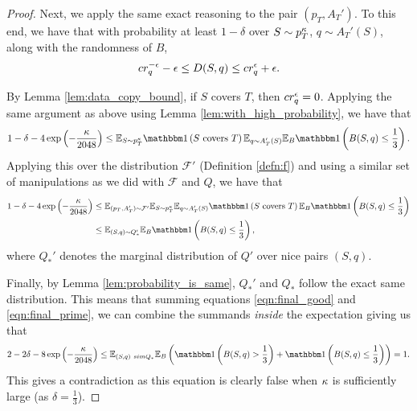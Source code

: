 \begin{proof}
Next, we apply the same exact reasoning to the pair $(p_T, A_T')$. To this end, we have that with probability at least $1 - \delta$ over $S \sim p_T^\kappa$, $q \sim A_T'(S)$, along with the randomness of $B$, $$cr_q^{-\epsilon} - \epsilon \leq D(S, q) \leq cr_q^{\epsilon} + \epsilon.$$ 

By Lemma \ref{lem:data_copy_bound}, if $S$ covers $T$, then $cr_q^\epsilon = 0$. Applying the same argument as above using Lemma \ref{lem:with_high_probability}, we have that 
\begin{equation*}
\begin{split}
1 - \delta -  4\exp\left(-\frac{\a}{2048}\right)\leq \E_{S \sim p_T^\a}\ind\left(S\text{ covers }T\right)\E_{q \sim A_T'(S)}\E_B \ind\left(B(S, q) \leq \frac{1}{3} \right).
\end{split}
\end{equation*}
Applying this over the distribution $\mathcal{F}'$ (Definition \ref{defn:f}) and using a similar set of manipulations as we did with $\mathcal{F}$ and $Q$, we have that
\begin{equation}\label{eqn:final_prime}
\begin{split}
1 - \delta -  4\exp\left(-\frac{\a}{2048}\right) &\leq \mathbb{E}_{(p_T, A_T') \sim \mathcal{F'}} \mathbb{E}_{S \sim p_T^\a}\mathbb{E}_{q \sim A_T'(S)} \ind\left(S\text{ covers }T\right)\mathbb{E}_{B}\ind\left(B(S, q) \leq \frac{1}{3}\right)\\
&\leq \mathbb{E}_{(S, q) \sim Q_*'}\mathbb{E}_{B}\ind\left(B(S, q) \leq \frac{1}{3}\right),
\end{split}
\end{equation}
where $Q_*'$ denotes the marginal distribution of $Q'$ over nice pairs $(S, q)$. 

Finally, by Lemma \ref{lem:probability_is_same}, $Q_*'$ and $Q_*$ follow the exact same distribution. This means that summing equations \ref{eqn:final_good} and \ref{eqn:final_prime}, we can combine the summands \textit{inside} the expectation giving us that $$2 - 2\delta - 8\exp\left(-\frac{\a}{2048}\right) \leq \E_{(S, q)\ sim Q_*} \E_B \left(\ind\left(B(S, q) > \frac{1}{3}\right)+\ind\left(B(S, q) \leq \frac{1}{3}\right) \right) = 1.$$ This gives a contradiction as this equation is clearly false when $\kappa$ is sufficiently large (as $\delta = \frac{1}{3}$). 


\end{proof}











 